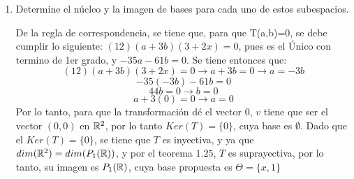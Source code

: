 \begin{enumerate}
    \item Determine el núcleo y la imagen de bases para cada uno de estos subespacios.

    De la regla de correspondencia, se tiene que, para que T(a,b)=0, se debe cumplir lo siguiente:
    $(12)(a + 3b)(3 + 2x) = 0$, pues es el Único con termino de 1er grado, y $-35a - 61b = 0$. Se tiene entonces que:
    \begin{equation*}
        (12)(a+3b)(3+2x)=0 \longrightarrow a+3b=0 \longrightarrow a=-3b
    \end{equation*}
    \begin{equation*}
        -35(-3b)-61b=0
    \end{equation*}
    \begin{equation*}
        44b=0 \longrightarrow b=0
    \end{equation*}
    \begin{equation*}
        a+3(0)=0 \longrightarrow a=0
    \end{equation*}
    Por lo tanto, para que la transformación dé el vector $0$, $v$ tiene que ser el vector $(0,0)$ 
     en $\mathbb{R}^2$, por lo tanto $Ker(T) = \{ 0 \}$, cuya base es $\emptyset$. Dado que el
     $Ker(T) = \{0\}$, se tiene que $T$ es inyectiva, y ya que $dim(\mathbb{R}^2) = dim(P_{1}(\mathbb{R}))$,
     y por el teorema $1.25$, $T$ es suprayectiva, por lo tanto, su imagen es $P_1(\mathbb{R})$, 
     cuya base propuesta es $\Theta = \{x,1\}$

    
\end{enumerate}